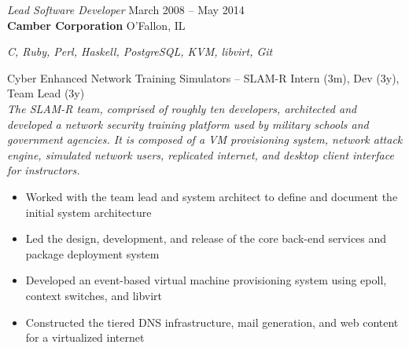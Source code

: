\documentclass[margin,line]{resume}
\begin{document}
\begin{resume}
{\sl Lead Software Developer} \hfill
     March 2008 -- May 2014\\
     \textbf{Camber Corporation} \hfill
     O'Fallon, IL\\[4pt]
{\small\centering\textit{C, Ruby, Perl, Haskell, PostgreSQL, KVM, libvirt, Git}\par}\vspace*{-\baselineskip}
\vspace{4pt}
{\small Cyber Enhanced Network Training Simulators -- SLAM-R  \hfill  Intern (3m), Dev (3y), Team Lead (3y)}\\
{\small\textit{The SLAM-R team, comprised of roughly ten developers, architected and developed a network security
training platform used by military schools and government agencies. It is composed of a VM provisioning system, network
attack engine, simulated network users, replicated internet, and desktop client interface for instructors.}}
\begin{itemize} \itemsep -2pt %
\small\item Worked with the team lead and system architect to define and document the initial system architecture
\small\item Led the design, development, and release of the core back-end services and package deployment system
\small\item Developed an event-based virtual machine provisioning system using epoll, context switches, and libvirt
\small\item Constructed the tiered DNS infrastructure, mail generation, and web content for a virtualized internet

\end{itemize}
\end{resume}
\end{document}
